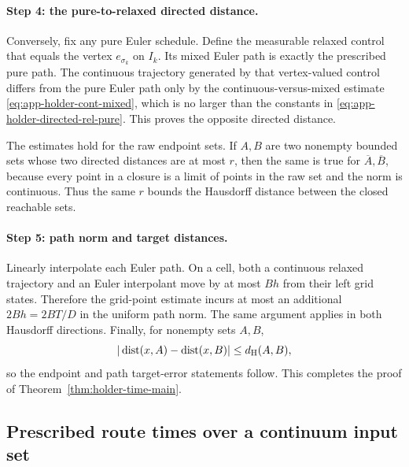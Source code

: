 \documentclass[twoside,11pt]{article}
\newcommand{\dist}{\operatorname{dist}}
\begin{document}
\paragraph{Step 4: the pure-to-relaxed directed distance.}
Conversely, fix any pure Euler schedule.  Define the measurable relaxed
control that equals the vertex $e_{\sigma_k}$ on $I_k$.  Its mixed Euler path
is exactly the prescribed pure path.  The continuous trajectory generated by
that vertex-valued control differs from the pure Euler path only by the
continuous-versus-mixed estimate \eqref{eq:app-holder-cont-mixed}, which is no
larger than the constants in \eqref{eq:app-holder-directed-rel-pure}.  This
proves the opposite directed distance.

The estimates hold for the raw endpoint sets.  If $A,B$ are two nonempty
bounded sets whose two directed distances are at most $r$, then the same is
true for $\overline A,\overline B$, because every point in a closure is a
limit of points in the raw set and the norm is continuous.  Thus the same
$r$ bounds the Hausdorff distance between the closed reachable sets.

\paragraph{Step 5: path norm and target distances.}
Linearly interpolate each Euler path.  On a cell, both a continuous relaxed
trajectory and an Euler interpolant move by at most $Bh$ from their left grid
states.  Therefore the grid-point estimate incurs at most an additional
$2Bh=2BT/D$ in the uniform path norm.  The same argument applies in both
Hausdorff directions.  Finally, for nonempty sets $A,B$,
\begin{equation}
 |\dist(x,A)-\dist(x,B)|\le d_{\rm H}(A,B),
 \label{eq:app-holder-distance-lipschitz}
\end{equation}
so the endpoint and path target-error statements follow.  This completes the
proof of Theorem~\ref{thm:holder-time-main}.

\subsection{Prescribed route times over a continuum input set}
\label{app:distributional-route-proof}
\end{document}
